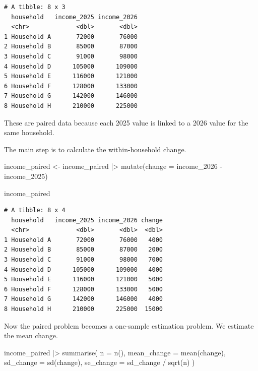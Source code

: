 \documentclass[
  letterpaper,
  DIV=11,
  numbers=noendperiod]{scrreprt}
\newenvironment{Shaded}{\begin{snugshade}}{\end{snugshade}}
\newcommand{\AttributeTok}[1]{\textcolor[rgb]{0.40,0.45,0.13}{#1}}
\newcommand{\FunctionTok}[1]{\textcolor[rgb]{0.28,0.35,0.67}{#1}}
\newcommand{\NormalTok}[1]{\textcolor[rgb]{0.00,0.23,0.31}{#1}}
\newcommand{\OtherTok}[1]{\textcolor[rgb]{0.00,0.23,0.31}{#1}}
\newcommand{\SpecialCharTok}[1]{\textcolor[rgb]{0.37,0.37,0.37}{#1}}
\begin{document}
\begin{verbatim}
# A tibble: 8 x 3
  household   income_2025 income_2026
  <chr>             <dbl>       <dbl>
1 Household A       72000       76000
2 Household B       85000       87000
3 Household C       91000       98000
4 Household D      105000      109000
5 Household E      116000      121000
6 Household F      128000      133000
7 Household G      142000      146000
8 Household H      210000      225000
\end{verbatim}

These are paired data because each 2025 value is linked to a 2026 value
for the same household.

The main step is to calculate the within-household change.

\begin{Shaded}
\begin{Highlighting}[]
\NormalTok{income\_paired }\OtherTok{\textless{}{-}}\NormalTok{ income\_paired }\SpecialCharTok{|\textgreater{}}
  \FunctionTok{mutate}\NormalTok{(}\AttributeTok{change =}\NormalTok{ income\_2026 }\SpecialCharTok{{-}}\NormalTok{ income\_2025)}

\NormalTok{income\_paired}
\end{Highlighting}
\end{Shaded}

\begin{verbatim}
# A tibble: 8 x 4
  household   income_2025 income_2026 change
  <chr>             <dbl>       <dbl>  <dbl>
1 Household A       72000       76000   4000
2 Household B       85000       87000   2000
3 Household C       91000       98000   7000
4 Household D      105000      109000   4000
5 Household E      116000      121000   5000
6 Household F      128000      133000   5000
7 Household G      142000      146000   4000
8 Household H      210000      225000  15000
\end{verbatim}

Now the paired problem becomes a one-sample estimation problem. We
estimate the mean change.

\begin{Shaded}
\begin{Highlighting}[]
\NormalTok{income\_paired }\SpecialCharTok{|\textgreater{}}
  \FunctionTok{summarise}\NormalTok{(}
    \AttributeTok{n =} \FunctionTok{n}\NormalTok{(),}
    \AttributeTok{mean\_change =} \FunctionTok{mean}\NormalTok{(change),}
    \AttributeTok{sd\_change =} \FunctionTok{sd}\NormalTok{(change),}
    \AttributeTok{se\_change =}\NormalTok{ sd\_change }\SpecialCharTok{/} \FunctionTok{sqrt}\NormalTok{(n)}
\NormalTok{  )}
\end{Highlighting}
\end{Shaded}
\end{document}
